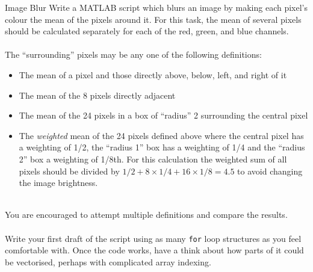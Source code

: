 \documentclass{lab}
\begin{document}
\pagebreak

\begin{task}{Image Blur}{}
Write a MATLAB script which blurs an image by making each pixel's colour the mean of the pixels around it. For this task, the mean of several pixels should be calculated separately for each of the red, green, and blue channels.
\\~\\
The ``surrounding'' pixels may be any one of the following definitions:
\begin{itemize}
	\item The mean of a pixel and those directly above, below, left, and right of it
	\item The mean of the 8 pixels directly adjacent
	\item The mean of the 24 pixels  in a box of ``radius'' 2 surrounding the central pixel
	\item The \textit{weighted} mean of the 24 pixels defined above where the central pixel has a weighting of 1/2, the ``radius 1'' box has a weighting of 1/4 and the ``radius 2'' box a weighting of 1/8th. For this calculation the weighted sum of all pixels should be divided by $1/2+8\times1/4+16\times1/8 = 4.5$ to avoid changing the image brightness.
\end{itemize}
~\\
You are encouraged to attempt multiple definitions and compare the results.
\\~\\
Write your first draft of the script using as many \texttt{for} loop structures as you feel comfortable with. Once the code works, have a think about how parts of it could be vectorised, perhaps with complicated array indexing.
\end{task}
\end{document}
